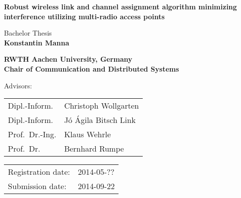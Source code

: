\titlehead{
	\centering
	\texttt{[image: logos/comsys-text]}
	\hfill
	\texttt{[image: logos/rwth]}
} %

\begin{titlepage}

\let\footnotesize\small \let\footnoterule\relax

\hbox{}
\vfill

\centering

\begin{doublespace}
{ \huge\textbf{\textsf{Robust wireless link and channel assignment algorithm
minimizing interference utilizing multi-radio access points 
}}}
\end{doublespace}
\vskip 2cm

{\large Bachelor Thesis\\[5pt]}
{\large \textbf{Konstantin Manna}}
\vskip 1cm

\textbf{RWTH Aachen University, Germany\\[5pt]
        Chair of Communication and Distributed Systems}
\vskip 2cm

\large

Advisors:
\vskip 2mm

\begin{tabular}{R{7cm}p{7cm}}
Dipl.-Inform. & Christoph Wollgarten\\
Dipl.-Inform. & J\'o \'Agila Bitsch Link\\
Prof.~Dr.-Ing. & Klaus Wehrle\\
Prof.~Dr. & Bernhard Rumpe
\end{tabular}
\vskip 1cm

\begin{tabular}{R{6cm}p{6cm}}
Registration date:  & 2014-05-?? \\
Submission date:    & 2014-09-22 \\
\end{tabular}

\vfill

\end{titlepage}

